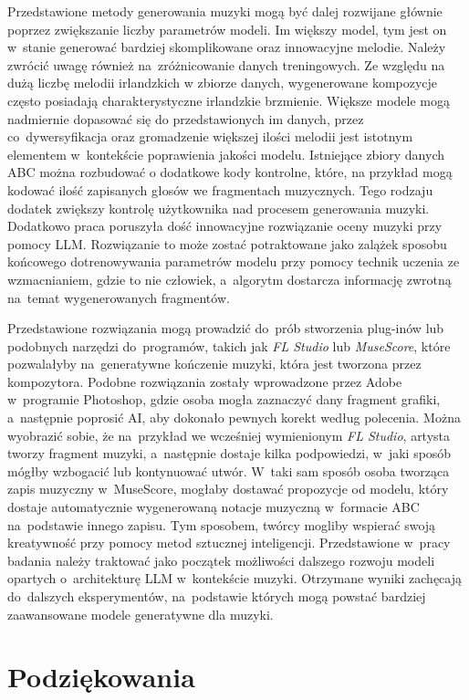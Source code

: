 \documentclass[data-science]{agh-wi} %
\begin{document}
Przedstawione metody generowania muzyki mogą być dalej rozwijane głównie poprzez zwiększanie liczby parametrów modeli. Im większy model, tym jest on w~stanie generować bardziej skomplikowane oraz innowacyjne melodie. Należy zwrócić uwagę również na~zróżnicowanie danych treningowych. Ze względu na dużą liczbę melodii irlandzkich w zbiorze danych, wygenerowane kompozycje często posiadają charakterystyczne irlandzkie brzmienie. Większe modele mogą nadmiernie dopasować się do przedstawionych im danych, przez co~dywersyfikacja oraz gromadzenie większej ilości melodii jest istotnym elementem w~kontekście poprawienia jakości modelu. Istniejące zbiory danych ABC można rozbudować o dodatkowe kody kontrolne, które, na przykład mogą kodować ilość zapisanych głosów we fragmentach muzycznych. Tego rodzaju dodatek zwiększy kontrolę użytkownika nad procesem generowania muzyki. Dodatkowo praca poruszyła dość innowacyjne rozwiązanie oceny muzyki przy pomocy LLM. Rozwiązanie to może zostać potraktowane jako zalążek sposobu końcowego dotrenowywania parametrów modelu przy pomocy technik uczenia ze wzmacnianiem, gdzie to nie człowiek, a~algorytm dostarcza informację zwrotną na~temat wygenerowanych fragmentów.

Przedstawione rozwiązania mogą prowadzić do~prób stworzenia plug-inów lub podobnych narzędzi do~programów, takich jak \textit{FL Studio} lub \textit{MuseScore}, które pozwalałyby na~generatywne kończenie muzyki, która jest tworzona przez kompozytora. Podobne rozwiązania zostały wprowadzone przez Adobe w~programie Photoshop, gdzie osoba mogła zaznaczyć dany fragment grafiki, a~następnie poprosić AI, aby dokonało pewnych korekt według polecenia. Można wyobrazić sobie, że na~przykład we wcześniej wymienionym \textit{FL Studio}, artysta tworzy fragment muzyki, a~następnie dostaje kilka podpowiedzi, w~jaki sposób mógłby wzbogacić lub kontynuować utwór. W~taki sam sposób osoba tworząca zapis muzyczny w~MuseScore, mogłaby dostawać propozycje od modelu, który dostaje automatycznie wygenerowaną notacje muzyczną w~formacie ABC na~podstawie innego zapisu. Tym sposobem, twórcy mogliby wspierać swoją kreatywność przy pomocy metod sztucznej inteligencji. Przedstawione w~pracy badania należy traktować jako początek możliwości dalszego rozwoju modeli opartych o~architekturę LLM w~kontekście muzyki. Otrzymane wyniki zachęcają do~dalszych eksperymentów, na~podstawie których mogą powstać bardziej zaawansowane modele generatywne dla muzyki.

\chapter{Podziękowania}
\end{document}
